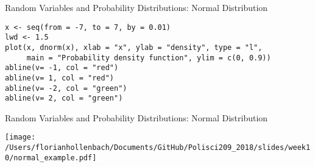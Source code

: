 \documentclass[presentation]{beamer}
\begin{document}
\begin{frame}[fragile,shrink=30,label={sec:org3c4c69b}]{Random Variables and Probability Distributions: Normal Distribution}
 \begin{verbatim}
x <- seq(from = -7, to = 7, by = 0.01)
lwd <- 1.5
plot(x, dnorm(x), xlab = "x", ylab = "density", type = "l",
     main = "Probability density function", ylim = c(0, 0.9))
abline(v= -1, col = "red")
abline(v= 1, col = "red")
abline(v= -2, col = "green")
abline(v= 2, col = "green")
\end{verbatim}
\end{frame}



\begin{frame}[label={sec:org5553b95}]{Random Variables and Probability Distributions: Normal Distribution}
\begin{center}
\texttt{[image: /Users/florianhollenbach/Documents/GitHub/Polisci209\_2018/slides/week10/normal\_example.pdf]}
\end{center}
\end{frame}
\end{document}
